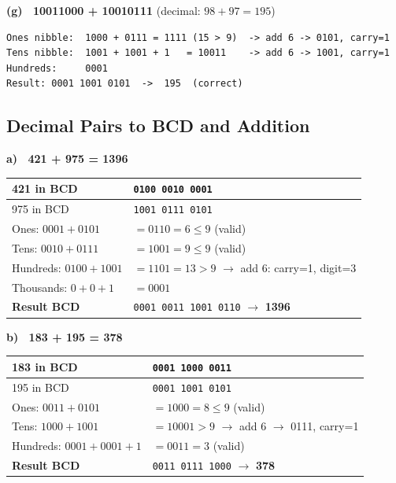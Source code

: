 \documentclass[12pt,a4paper]{article}
\begin{document}
\textbf{(g) \ 10011000 + 10010111} \quad (decimal: $98 + 97 = 195$)

\begin{verbatim}
Ones nibble:  1000 + 0111 = 1111 (15 > 9)  -> add 6 -> 0101, carry=1
Tens nibble:  1001 + 1001 + 1   = 10011    -> add 6 -> 1001, carry=1
Hundreds:     0001
Result: 0001 1001 0101  ->  195  (correct)
\end{verbatim}

\newpage
\subsection{Decimal Pairs to BCD and Addition}

\textbf{a) \ 421 + 975 = 1396}

\begin{table}[H]
\centering
\small
\begin{tabular}{|l|l|}
\hline
421 in BCD & \texttt{0100 0010 0001} \\
\hline
975 in BCD & \texttt{1001 0111 0101} \\
\hline
Ones: $0001+0101$  & $= 0110 = 6 \leq 9$ (valid) \\
\hline
Tens: $0010+0111$  & $= 1001 = 9 \leq 9$ (valid) \\
\hline
Hundreds: $0100+1001$ & $= 1101 = 13 > 9$ $\to$ add 6: carry=1, digit=3 \\
\hline
Thousands: $0+0+1$ & $= 0001$ \\
\hline
\textbf{Result BCD} & \texttt{0001 0011 1001 0110} $\to$ \textbf{1396} \\
\hline
\end{tabular}
\end{table}

\textbf{b) \ 183 + 195 = 378}

\begin{table}[H]
\centering
\small
\begin{tabular}{|l|l|}
\hline
183 in BCD & \texttt{0001 1000 0011} \\
\hline
195 in BCD & \texttt{0001 1001 0101} \\
\hline
Ones: $0011+0101$  & $= 1000 = 8 \leq 9$ (valid) \\
\hline
Tens: $1000+1001$  & $= 10001 > 9$ $\to$ add 6 $\to$ 0111, carry=1 \\
\hline
Hundreds: $0001+0001+1$ & $= 0011 = 3$ (valid) \\
\hline
\textbf{Result BCD} & \texttt{0011 0111 1000} $\to$ \textbf{378} \\
\hline
\end{tabular}
\end{table}
\end{document}
